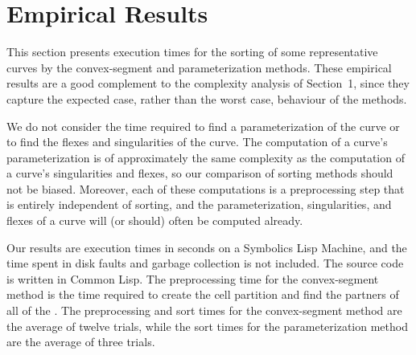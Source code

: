 \section{Empirical Results}

This section presents execution times for the sorting of some representative
curves by the convex-segment and parameterization methods.
These empirical results are a good complement to the complexity analysis 
of Section~1, since they capture the expected case, rather than the worst 
case, behaviour of the methods.

We do not consider the time required to find a parameterization of the
curve or to find the flexes and singularities of the curve.
The computation of a curve's parameterization is of approximately the same
complexity as the computation of a curve's singularities and flexes,
so our comparison of sorting methods should not be biased.
Moreover, each of these computations
is a preprocessing step that is entirely independent of sorting,
and the parameterization, singularities, and flexes of a curve will
(or should) often be computed already.

Our results are execution times in seconds on a Symbolics Lisp Machine, 
and the time spent in disk faults and garbage collection is not included.
The source code is written in Common Lisp.
The preprocessing time for the convex-segment method 
is the time required to create the cell partition and find the partners of all
of the \wallpoints.
The preprocessing and sort times for the convex-segment
method are the average of twelve trials, while the 
sort times for the parameterization method are the average of three
trials.

